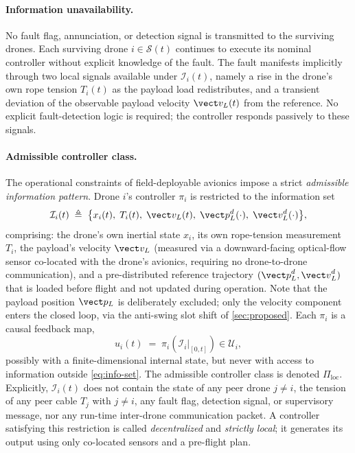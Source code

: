 \paragraph{Information unavailability.} No fault flag, annunciation, or detection signal is transmitted to the surviving drones. Each surviving drone $i \in \mathcal{S}(t)$ continues to execute its nominal controller without explicit knowledge of the fault. The fault manifests implicitly through two local signals available under $\mathcal{I}_i(t)$, namely a rise in the drone's own rope tension $T_i(t)$ as the payload load redistributes, and a transient deviation of the observable payload velocity $\vect v_L(t)$ from the reference. No explicit fault-detection logic is required; the controller responds passively to these signals.

\paragraph{Admissible controller class.} The operational constraints of field-deployable avionics impose a strict \emph{admissible information pattern}. Drone $i$'s controller $\pi_i$ is restricted to the information set
\begin{equation}
  \mathcal{I}_i(t) \;\triangleq\;
    \bigl\{x_i(t),\; T_i(t),\; \vect v_L(t),\;
      \vect p_L^d(\cdot),\; \vect v_L^d(\cdot)\bigr\},
  \label{eq:info-set}
\end{equation}
comprising: the drone's own inertial state $x_i$, its own rope-tension measurement $T_i$, the payload's velocity $\vect v_L$ (measured via a downward-facing optical-flow sensor co-located with the drone's avionics, requiring no drone-to-drone communication), and a pre-distributed reference trajectory $({\vect p}_L^d, {\vect v}_L^d)$ that is loaded before flight and not updated during operation. Note that the payload position $\vect p_L$ is deliberately excluded; only the velocity component enters the closed loop, via the anti-swing slot shift of \cref{sec:proposed}. Each $\pi_i$ is a causal feedback map,
\begin{equation}
 u_i(t) \;=\; \pi_i\!\left(
    \left.\mathcal{I}_i\right|_{[0,t]}
  \right) \in \mathcal{U}_i,
  \label{eq:controller-map}
\end{equation}
possibly with a finite-dimensional internal state, but never with access to information outside \eqref{eq:info-set}. The admissible controller class is denoted $\Pi_{\mathrm{loc}}$. Explicitly, $\mathcal{I}_i(t)$ does not contain the state of any peer drone $j \ne i$, the tension of any peer cable $T_j$ with $j \ne i$, any fault flag, detection signal, or supervisory message, nor any run-time inter-drone communication packet. A controller satisfying this restriction is called \emph{decentralized} and
\emph{strictly local}; it generates its output using only co-located sensors and a pre-flight plan.

